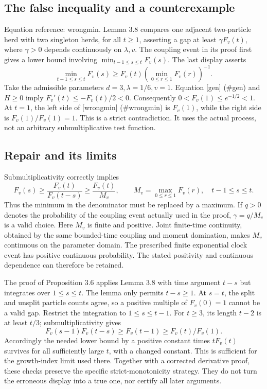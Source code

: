 \documentclass[10pt]{article}
\begin{document}
\subsection*{The false inequality and a counterexample}
Equation reference: wrongmin. Lemma 3.8 compares one adjacent two-particle herd with two singleton herds, for all \(t\geq1\), asserting a gap at least \(\gamma F_v(t)\), where \(\gamma>0\) depends continuously on \(\lambda,v\). The coupling event in its proof first gives a lower bound involving \(\min_{t-1\leq s\leq t}F_v(s)\). The last display asserts \[
 \min_{t-1\leq s\leq t}F_v(s)
 \geq F_v(t)\left(\min_{0\leq r\leq1}F_v(r)\right)^{-1}.\] Take the admissible parameters \(d=3,\lambda=1/6,v=1\). Equation [gen] (\#gen) and \(H\geq0\) imply \(F_v'(t)\leq-F_v(t)/2<0\). Consequently \(0<F_v(1)\leq e^{-1/2}<1\). At \(t=1\), the left side of [wrongmin] (\#wrongmin) is \(F_v(1)\), while the right side is \(F_v(1)/F_v(1)=1\). This is a strict contradiction. It uses the actual process, not an arbitrary submultiplicative test function.\par
\subsection*{Repair and its limits}
Submultiplicativity correctly implies \[F_v(s)\geq \frac{F_v(t)}{F_v(t-s)}
 \geq \frac{F_v(t)}{M_v},\qquad
 M_v=\max_{0\leq r\leq1}F_v(r),\quad t-1\leq s\leq t .\] Thus the minimum in the denominator must be replaced by a maximum. If \(q>0\) denotes the probability of the coupling event actually used in the proof, \(\gamma=q/M_v\) is a valid choice. Here \(M_v\) is finite and positive. Joint finite-time continuity, obtained by the same bounded-time coupling and moment domination, makes \(M_v\) continuous on the parameter domain. The prescribed finite exponential clock event has positive continuous probability. The stated positivity and continuous dependence can therefore be retained.\par
The proof of Proposition 3.6 applies Lemma 3.8 with time argument \(t-s\) but integrates over \(1\leq s\leq t\). The lemma only permits \(t-s\geq1\). At \(s=t\), the split and unsplit particle counts agree, so a positive multiple of \(F_v(0)=1\) cannot be a valid gap. Restrict the integration to \(1\leq s\leq t-1\). For \(t\geq3\), its length \(t-2\) is at least \(t/3\); submultiplicativity gives \[F_v(s-1)F_v(t-s)\geq F_v(t-1)
       \geq F_v(t)/F_v(1).\] Accordingly the needed lower bound by a positive constant times \(tF_v(t)\) survives for all sufficiently large \(t\), with a changed constant. This is sufficient for the growth-index limit used there. Together with a corrected derivative proof, these checks preserve the specific strict-monotonicity strategy. They do not turn the erroneous display into a true one, nor certify all later arguments.\par
\end{document}
